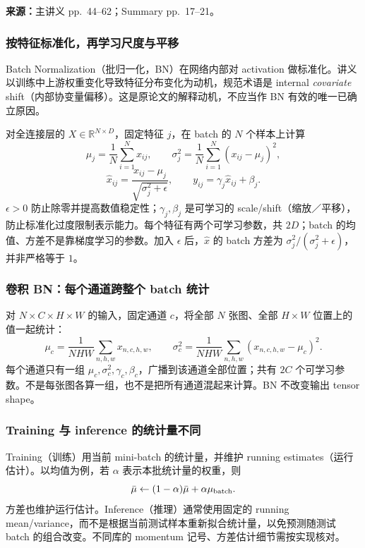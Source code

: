 
\textbf{来源：}主讲义 pp.~44--62；Summary pp.~17--21。

\subsubsection{按特征标准化，再学习尺度与平移}

Batch Normalization（批归一化，BN）在网络内部对 activation 做标准化。讲义以训练中上游权重变化导致特征分布变化为动机，规范术语是 internal \emph{covariate} shift（内部协变量偏移）。这是原论文的解释动机，不应当作 BN 有效的唯一已确立原因。

对全连接层的 $X\in\mathbb R^{N\times D}$，固定特征 $j$，在 batch 的 $N$ 个样本上计算
\[
 \mu_j=\frac1N\sum_{i=1}^N x_{ij},\qquad
 \sigma_j^2=\frac1N\sum_{i=1}^N(x_{ij}-\mu_j)^2,
\]
\[
 \hat x_{ij}=\frac{x_{ij}-\mu_j}{\sqrt{\sigma_j^2+\epsilon}},
 \qquad y_{ij}=\gamma_j\hat x_{ij}+\beta_j.
\]
$\epsilon>0$ 防止除零并提高数值稳定性；$\gamma_j,\beta_j$ 是可学习的 scale/shift（缩放／平移），防止标准化过度限制表示能力。每个特征有两个可学习参数，共 $2D$；batch 的均值、方差不是靠梯度学习的参数。加入 $\epsilon$ 后，$\hat x$ 的 batch 方差为 $\sigma_j^2/(\sigma_j^2+\epsilon)$，并非严格等于 $1$。

\subsubsection{卷积 BN：每个通道跨整个 batch 统计}

对 $N\times C\times H\times W$ 的输入，固定通道 $c$，将全部 $N$ 张图、全部 $H\times W$ 位置上的值一起统计：
\[
 \mu_c=\frac{1}{NHW}\sum_{n,h,w}x_{n,c,h,w},\qquad
 \sigma_c^2=\frac{1}{NHW}\sum_{n,h,w}(x_{n,c,h,w}-\mu_c)^2.
\]
每个通道只有一组 $\mu_c,\sigma_c^2,\gamma_c,\beta_c$，广播到该通道全部位置；共有 $2C$ 个可学习参数。不是每张图各算一组，也不是把所有通道混起来计算。BN 不改变输出 tensor shape。

\subsubsection{Training 与 inference 的统计量不同}

Training（训练）用当前 mini-batch 的统计量，并维护 running estimates（运行估计）。以均值为例，若 $\alpha$ 表示本批统计量的权重，则
\[
 \bar\mu\leftarrow(1-\alpha)\bar\mu+\alpha\mu_{\rm batch}.
\]
方差也维护运行估计。Inference（推理）通常使用固定的 running mean/variance，而不是根据当前测试样本重新拟合统计量，以免预测随测试 batch 的组合改变。不同库的 momentum 记号、方差估计细节需按实现核对。

